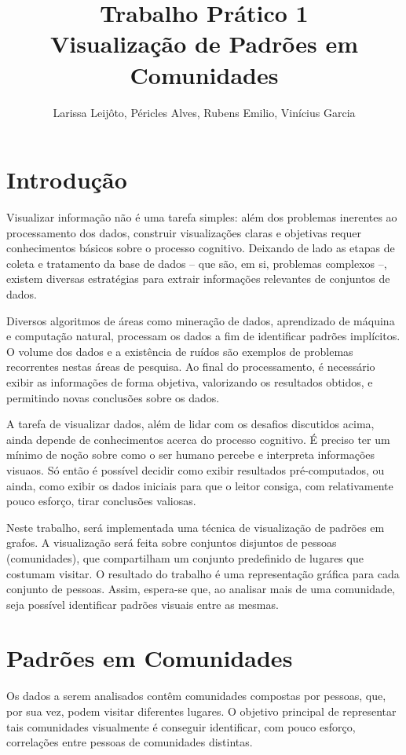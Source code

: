 \documentclass[12pt]{article}
\title{Trabalho Prático 1 \\ Visualização de Padrões em Comunidades}
\author{Larissa Leijôto, Péricles Alves, Rubens Emilio, Vinícius Garcia}
\begin{document}
\maketitle

\section{Introdução}
Visualizar informação não é uma tarefa simples: além dos problemas inerentes
ao processamento dos dados, construir visualizações claras e objetivas requer
conhecimentos básicos sobre o processo cognitivo.
Deixando de lado as etapas de coleta e tratamento da base de dados --
que são, em si, problemas complexos --, existem diversas estratégias para
extrair informações relevantes de conjuntos de dados.

Diversos algoritmos de áreas como mineração de dados, aprendizado de máquina
e computação natural, processam os dados a fim de identificar padrões
implícitos. O volume dos dados e a existência de ruídos são exemplos
de problemas recorrentes nestas áreas de pesquisa. Ao final do processamento,
é necessário exibir as informações de forma objetiva, valorizando os resultados
obtidos, e permitindo novas conclusões sobre os dados.

A tarefa de visualizar dados, além de lidar com os desafios discutidos
acima, ainda depende de conhecimentos acerca do processo cognitivo.
É preciso ter um mínimo de noção sobre como o ser humano percebe e interpreta
informações visuaos. Só então é possível decidir como exibir resultados
pré-computados, ou ainda, como exibir os dados iniciais para que o leitor
consiga, com relativamente pouco esforço, tirar conclusões valiosas.

Neste trabalho, será implementada uma técnica de visualização de padrões
em grafos. A visualização será feita sobre conjuntos disjuntos de pessoas
(comunidades), que compartilham um conjunto predefinido de lugares
que costumam visitar. O resultado do trabalho é uma representação gráfica
para cada conjunto de pessoas. Assim, espera-se que, ao analisar mais de uma
comunidade, seja possível identificar padrões visuais entre as mesmas.

\section{Padrões em Comunidades}
Os dados a serem analisados contêm comunidades compostas por pessoas,
que, por sua vez, podem visitar diferentes lugares. O objetivo principal
de representar tais comunidades visualmente é conseguir identificar,
com pouco esforço, correlações entre pessoas de comunidades distintas.
\end{document}
